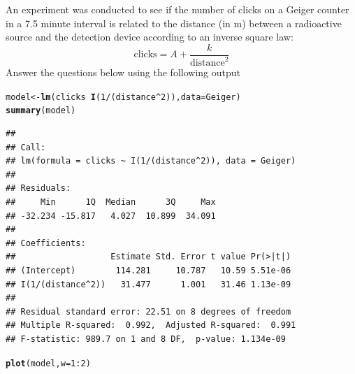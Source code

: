 \documentclass[twoside]{book}\usepackage[]{graphicx}\usepackage[]{xcolor}
\makeatletter
\newcommand{\hlnum}[1]{\textcolor[rgb]{0.686,0.059,0.569}{#1}}%
\newcommand{\hlopt}[1]{\textcolor[rgb]{0,0,0}{#1}}%
\newcommand{\hlstd}[1]{\textcolor[rgb]{0.345,0.345,0.345}{#1}}%
\newcommand{\hlkwb}[1]{\textcolor[rgb]{0.69,0.353,0.396}{#1}}%
\newcommand{\hlkwc}[1]{\textcolor[rgb]{0.333,0.667,0.333}{#1}}%
\newcommand{\hlkwd}[1]{\textcolor[rgb]{0.737,0.353,0.396}{\textbf{#1}}}%
\newenvironment{kframe}{%
 \def\at@end@of@kframe{}%
 \ifinner\ifhmode%
  \def\at@end@of@kframe{\end{minipage}}%
  \begin{minipage}{\columnwidth}%
 \fi\fi%
 \def\FrameCommand##1{\hskip\@totalleftmargin \hskip-\fboxsep
 \colorbox{shadecolor}{##1}\hskip-\fboxsep
     \hskip-\linewidth \hskip-\@totalleftmargin \hskip\columnwidth}%
 \MakeFramed {\advance\hsize-\width
   \@totalleftmargin\z@ \linewidth\hsize
   \@setminipage}}%
 {\par\unskip\endMakeFramed%
 \at@end@of@kframe}
\newenvironment{knitrout}{}{} %
\makeatother
\begin{document}
\begin{problem}
	An experiment was conducted to see if the number of clicks 
	on a Geiger counter in a 7.5 minute interval is related to
	the distance (in m) between a radioactive source and the detection 
	device according to an inverse square law:
	\[
	\mbox{clicks} =	A + \frac{k}{\mbox{distance}^{2}}
	\]
	Answer the questions below using the following output

\begin{knitrout}
\color{fgcolor}\begin{kframe}
\begin{alltt}
\hlstd{model} \hlkwb{<-} \hlkwd{lm}\hlstd{(clicks} \hlopt{~} \hlkwd{I}\hlstd{(}\hlnum{1}\hlopt{/}\hlstd{(distance}\hlopt{^}\hlnum{2}\hlstd{)),} \hlkwc{data} \hlstd{= Geiger)}
\hlkwd{summary}\hlstd{(model)}
\end{alltt}
\begin{verbatim}
## 
## Call:
## lm(formula = clicks ~ I(1/(distance^2)), data = Geiger)
## 
## Residuals:
##     Min      1Q  Median      3Q     Max 
## -32.234 -15.817   4.027  10.899  34.091 
## 
## Coefficients:
##                   Estimate Std. Error t value Pr(>|t|)
## (Intercept)        114.281     10.787   10.59 5.51e-06
## I(1/(distance^2))   31.477      1.001   31.46 1.13e-09
## 
## Residual standard error: 22.51 on 8 degrees of freedom
## Multiple R-squared:  0.992,	Adjusted R-squared:  0.991 
## F-statistic: 989.7 on 1 and 8 DF,  p-value: 1.134e-09
\end{verbatim}
\begin{alltt}
\hlkwd{plot}\hlstd{(model,} \hlkwc{w} \hlstd{=} \hlnum{1}\hlopt{:}\hlnum{2}\hlstd{)}
\end{alltt}
\end{kframe}


\end{knitrout}
\end{problem}
\end{document}
